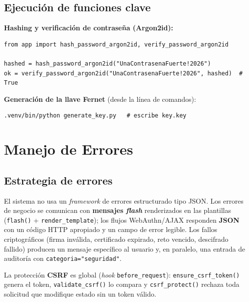 \documentclass[10pt,letterpaper]{report}
\begin{document}
\section{Ejecuci\'on de funciones clave}
\textbf{Hashing y verificaci\'on de contrase\~na (Argon2id):}
\begin{lstlisting}[style=python]
from app import hash_password_argon2id, verify_password_argon2id

hashed = hash_password_argon2id("UnaContrasenaFuerte!2026")
ok = verify_password_argon2id("UnaContrasenaFuerte!2026", hashed)  # True
\end{lstlisting}

\textbf{Generaci\'on de la llave Fernet} (desde la l\'inea de comandos):
\begin{lstlisting}[style=bash]
.venv/bin/python generate_key.py   # escribe key.key
\end{lstlisting}

\chapter{Manejo de Errores}

\section{Estrategia de errores}
El sistema no usa un \emph{framework} de errores estructurado tipo JSON. Los errores de negocio se
comunican con \textbf{mensajes \emph{flash}} renderizados en las plantillas
(\texttt{flash()} + \texttt{render\_template}); los flujos WebAuthn/AJAX responden \textbf{JSON} con un
c\'odigo HTTP apropiado y un campo de error legible. Los fallos criptogr\'aficos (firma inv\'alida,
certificado expirado, reto vencido, descifrado fallido) producen un mensaje espec\'ifico al usuario
y, en paralelo, una entrada de auditor\'ia con \texttt{categoria="seguridad"}.

La protecci\'on \textbf{CSRF} es global (\emph{hook} \texttt{before\_request}): \texttt{ensure\_csrf\_token()}
genera el token, \texttt{validate\_csrf()} lo compara y \texttt{csrf\_protect()} rechaza toda
solicitud que modifique estado sin un token v\'alido.
\end{document}

